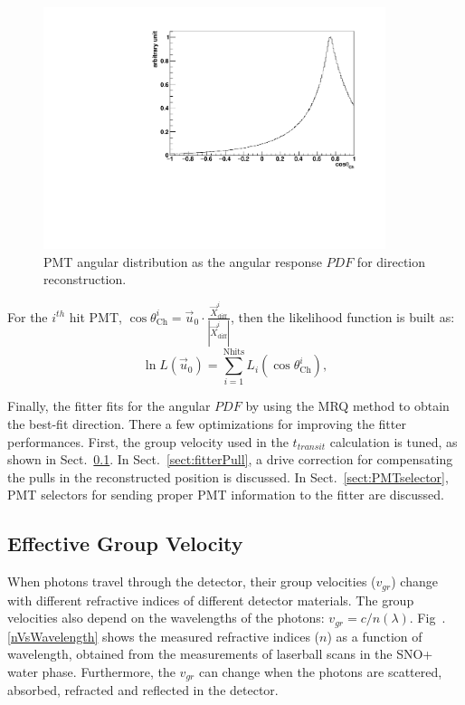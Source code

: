 \begin{figure}[!htb]
	\centering
	\includegraphics[width=10cm]{MPW_angularPDF.pdf}
	\caption{PMT angular distribution as the angular response $PDF$ for direction reconstruction.}
	\label{fig:MPW_angularPDF}
\end{figure}

For the $i^{th}$ hit PMT, $\cos\theta^i_{\mathrm{Ch}}=\vec{u}_0\cdot\frac{\vec{X}^i_{{\mathrm{diff}}}}{|\vec{X}^i_{{\mathrm{diff}}}|}$, then the likelihood function is built as:
\begin{equation}
\ln L(\vec{u}_0)=\sum_{i=1}^{{\mathrm{Nhits}}}L_i(\cos\theta_{\mathrm{Ch}}^i),
\end{equation}

Finally, the fitter fits for the angular $PDF$ by using the MRQ method to obtain the best-fit direction. There a few optimizations for improving the fitter performances. First, the group velocity used in the $t_{transit}$ calculation is tuned, as shown in Sect.~\ref{sect:tuneGroupVelocity}. In Sect.~\ref{sect:fitterPull}, a drive correction for compensating the pulls in the reconstructed position is discussed. In Sect.~\ref{sect:PMTselector}, PMT selectors for sending proper PMT information to the fitter are discussed. 

\subsection{Effective Group Velocity}\label{sect:tuneGroupVelocity}
When photons travel through the detector, their group velocities ($v_{gr}$) change with different refractive indices of different detector materials. The group velocities also depend on the wavelengths of the photons: $v_{gr}=c/n(\lambda)$. Fig~.\ref{nVsWavelength} shows the measured refractive indices ($n$) as a function of wavelength, obtained from the measurements of laserball scans in the SNO+ water phase\cite{laserball_groupVelocity}. Furthermore, the $v_{gr}$ can change when the photons are scattered, absorbed, refracted and reflected in the detector.

